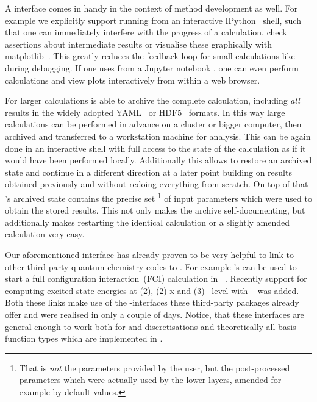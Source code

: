 A \python interface comes in handy in the context of method development as well.
For example we explicitly support running \molsturm from an interactive
IPython~ shell,
such that one can immediately interfere with the progress of a calculation,
check assertions about intermediate results
or visualise these graphically with matplotlib~.
This greatly reduces the feedback loop for small calculations
like during debugging.
If one uses \molsturm from a Jupyter notebook \cite{Jupyter},
one can even perform calculations and view plots
interactively from within a web browser.

For larger calculations \molsturm is able to archive the complete
calculation,
including \emph{all} \SCF results in
the widely adopted YAML~\cite{Ben-Kiki2009} or HDF5~\cite{HDF5Manual} formats.
In this way large calculations can be performed in advance
on a cluster or bigger computer,
then archived and transferred to a workstation machine
for analysis.
This can be again done in an interactive shell
with full access to the state of the calculation
as if it would have been performed locally.
Additionally this allows to restore an archived state
and continue in a different direction at a later point
building on results obtained previously
and without redoing everything from scratch.
On top of that \molsturm's archived state contains
the precise set%
\footnote{That is \emph{not} the parameters provided by the user,
but the post-processed parameters which were actually used
by the lower layers, amended for example by default values.}
of input parameters which were used to obtain the stored results.
This not only makes the archive self-documenting,
but additionally makes restarting the identical calculation
or a slightly amended calculation very easy.

Our aforementioned \numpy interface has already proven to be very helpful
to link to other third-party quantum chemistry codes to \molsturm.
For example \molsturm's \SCF can be used to start a
full configuration interaction~(FCI) calculation
in \pyscf~\cite{Sun2017}.
Recently support for computing excited state energies at \ADC(2),
\ADC(2)-x and \ADC(3)~\cite{Schirmer1982,Trofimov1999} level
with \adcman~\cite{Wormit2014} was added.
Both these links make use of the \python-\numpy interfaces
these third-party packages already offer and were realised in only a couple of days.
Notice, that these interfaces
are general enough to work both for \CS and \cGTO discretisations
and theoretically all basis function types which are implemented in \gint.

